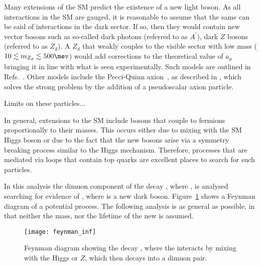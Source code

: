 Many extensions of the SM predict the existence of a new light boson.
As all interactions in the SM are gauged, it is reasonable to assume that the same can be said of
interactions in the dark sector.
If so, then they would contain new vector bosons such as so-called dark photons (referred to as
$A^{\prime}$), dark $Z$ bosons (referred to as $Z_d$).
A $Z_d$ that weakly couples to the visible sector with low mass
($10\lesssim m_{Z_d}\lesssim500\mev$) would add corrections to the theoretical value of $a_\mu$
bringing it in line with what is seen experimentally.
Such models are outlined in Refs.~\cite{Davoudiasl:2012qa,Davoudiasl:2012ag,Lee:2014lga}.
Other models include the Pecci-Quinn axion~\cite{PhysRevLett.38.1440}, as described in ,
which solves the strong \CP problem by the addition of a pseudoscalar axion particle.

Limits on these particles...


In general, extensions to the SM include bosons that couple to fermions proportionally to
their masses.
This occurs either due to mixing with the SM Higgs boson or due to the fact that the
new bosons arise via a symmetry breaking process similar to the Higgs mechanism.
Therefore, processes that are mediated via loops that contain top quarks are excellent places to
search for such particles.

In this analysis the dimuon component of the decay \btokstrmumu, where \kstartokpi, is analysed
searching for evidence of \dbtomumu, where \db is a new dark boson.
Figure~\ref{fig:feynman} shows a Feynman diagram of a potential process.
The following analysis is as general as possible, in that neither the mass, nor the lifetime of the
new \db is assumed.

\begin{figure}
  \begin{center}
    \texttt{[image: feynman\_inf]}
  \caption{\small
    Feynman diagram showing the decay \btokstrdb, where the \db interacts by mixing with the
    Higgs or $Z$, which then decays into a dimuon pair.
  }
  \label{fig:feynman}
\end{center}
\end{figure}

